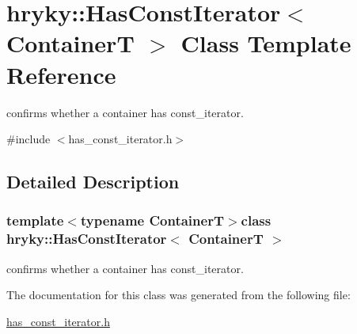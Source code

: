\hypertarget{classhryky_1_1_has_const_iterator}{\section{hryky\-:\-:Has\-Const\-Iterator$<$ Container\-T $>$ Class Template Reference}
\label{classhryky_1_1_has_const_iterator}
}


confirms whether a container has const\-\_\-iterator.  




{\ttfamily \#include $<$has\-\_\-const\-\_\-iterator.\-h$>$}



\subsection{Detailed Description}
\subsubsection*{template$<$typename Container\-T$>$class hryky\-::\-Has\-Const\-Iterator$<$ Container\-T $>$}

confirms whether a container has const\-\_\-iterator. 

The documentation for this class was generated from the following file\-:\begin{DoxyCompactItemize}
\item 
\hyperlink{has__const__iterator_8h}{has\-\_\-const\-\_\-iterator.\-h}\end{DoxyCompactItemize}
